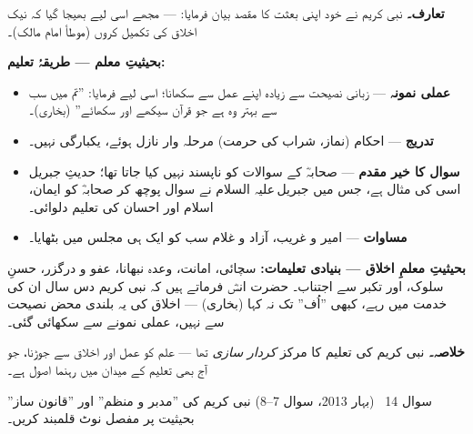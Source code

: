 \begin{hal}
\textbf{تعارف۔} نبی کریم \saw نے خود اپنی بعثت کا مقصد بیان فرمایا:
 --- مجھے اسی لیے
بھیجا گیا کہ نیک اخلاق کی تکمیل کروں (موطأ امام مالک)۔

\medskip
\textbf{بحیثیتِ معلم --- طریقۂ تعلیم:}
\begin{itemize}\setlength{\itemsep}{1pt}
  \item \textbf{عملی نمونہ} --- زبانی نصیحت سے زیادہ اپنے عمل سے سکھانا؛
        اسی لیے فرمایا: ''تم میں سب سے بہتر وہ ہے جو قرآن سیکھے اور
        سکھائے'' (بخاری)۔
  \item \textbf{تدریج} --- احکام (نماز، شراب کی حرمت) مرحلہ وار نازل ہوئے،
        یکبارگی نہیں۔
  \item \textbf{سوال کا خیر مقدم} --- صحابہؓ کے سوالات کو ناپسند نہیں
        کیا جاتا تھا؛ حدیثِ جبریل اسی کی مثال ہے، جس میں جبریل\,علیہ السلام
        نے سوال پوچھ کر صحابہؓ کو ایمان، اسلام اور احسان کی تعلیم دلوائی۔
  \item \textbf{مساوات} --- امیر و غریب، آزاد و غلام سب کو ایک ہی مجلس میں
        بٹھایا۔
\end{itemize}

\medskip
\textbf{بحیثیتِ معلمِ اخلاق --- بنیادی تعلیمات:} سچائی، امانت، وعدہ نبھانا،
عفو و درگزر، حسنِ سلوک، اور تکبر سے اجتناب۔ حضرت انسؓ فرماتے ہیں کہ نبی
کریم \saw دس سال ان کی خدمت میں رہے، کبھی ''اُف'' تک نہ کہا (بخاری) ---
اخلاق کی یہ بلندی محض نصیحت سے نہیں، عملی نمونے سے سکھائی گئی۔

\medskip
\textbf{خلاصہ۔} نبی کریم \saw کی تعلیم کا مرکز \emph{کردار سازی} تھا ---
علم کو عمل اور اخلاق سے جوڑنا، جو آج بھی تعلیم کے میدان میں رہنما اصول
ہے۔
\end{hal}

\begin{sawal}{سوال \textenglish{14} \ \textnormal{\small(بہار \textenglish{2013}، سوال \textenglish{7--8})}}
نبی کریم \saw کی ''مدبر و منظم'' اور ''قانون ساز'' بحیثیت پر مفصل نوٹ
قلمبند کریں۔
\end{sawal}

